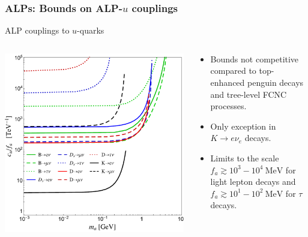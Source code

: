 \documentclass[mathserif, 10pt]{beamer}
\begin{document}
\begin{frame}\frametitle{ALPs: Bounds on ALP-$u$ couplings}
    ALP couplings to $u$-quarks
    \begin{columns}
        \begin{column}{0.5\textwidth}
            \includegraphics[width=\columnwidth]{figures/Fig2aS}
        \end{column}
        \begin{column}{0.5\textwidth}
            \begin{itemize}
                \item Bounds not competitive compared to top-enhanced penguin decays and tree-level FCNC processes.
                \item Only exception in $K\to e \nu_e$ decays.
                \item Limits to the scale $f_a \gtrsim 10^3- 10^4~\mathrm{MeV}$ for light lepton decays and $f_a \gtrsim 10^1 - 10^2~\mathrm{MeV}$ for $\tau$ decays.
            \end{itemize}
        \end{column}
    \end{columns}
\end{frame}
\end{document}

